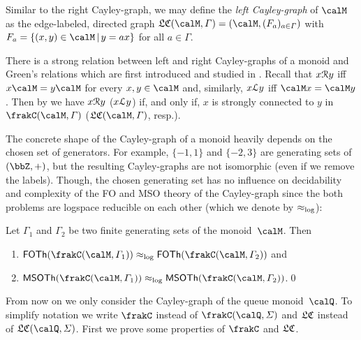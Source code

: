 Similar to the right Cayley-graph, we may define the \emph{left Cayley-graph} of $\calM$ as the edge-labeled, directed graph $\lcayley{\calM}{\varGamma}=(\calM,(F_a)_{a\in\varGamma})$ with $F_a=\{(x,y)\in\calM\,|\,y=ax\}$ for all $a\in\varGamma$.

\begin{remark}
	There is a strong relation between left and right Cayley-graphs of a monoid and Green's relations which are first introduced and studied in \cite{Gre51}. Recall that $x\mathcal{R} y$ iff $x\calM=y\calM$ for every $x,y\in\calM$ and, similarly, $x\mathcal{L} y$ iff $\calM x=\calM y$. Then by \cite[Proposition V.1.1]{pin2010} we have $x\mathcal{R} y$ ($x\mathcal{L} y$) if, and only if, $x$ is strongly connected to $y$ in $\cayley{\calM}{\varGamma}$ ($\lcayley{\calM}{\varGamma}$, resp.).
\end{remark}

The concrete shape of the Cayley-graph of a monoid heavily depends on the chosen set of generators. For example, $\{-1,1\}$ and $\{-2,3\}$ are generating sets of $(\bbZ,+)$, but the resulting Cayley-graphs are not isomorphic (even if we remove the labels). Though, the chosen generating set has no influence on decidability and complexity of the FO and MSO theory of the Cayley-graph since the both problems are logspace reducible on each other (which we denote by $\approx_{\operatorname{log}}$):

\begin{proposition}
	Let $\varGamma_1$ and $\varGamma_2$ be two finite generating sets of the monoid~$\calM$. Then
	\begin{enumerate}[(1)]
		\item $\FOTh{\cayley{\calM}{\varGamma_1}}\eqlog\FOTh{\cayley{\calM}{\varGamma_2}}$ and
		\item $\MSOTh{\cayley{\calM}{\varGamma_1}}\eqlog\MSOTh{\cayley{\calM}{\varGamma_2}}$.\qed
	\end{enumerate}
\end{proposition}

From now on we only consider the Cayley-graph of the queue monoid~$\Qx$. To simplify notation we write $\cQ$ instead of $\cayley{\Qx}{\varSigma}$ and $\mathfrak{LC}$ instead of $\lcayley{\Qx}{\varSigma}$. First we prove some properties of $\cQ$ and $\mathfrak{LC}$.

